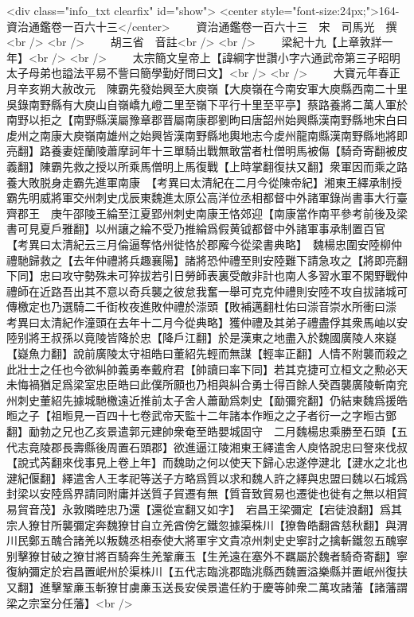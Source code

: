 <div class="info_txt clearfix" id="show">
<center style="font-size:24px;">164-資治通鑑卷一百六十三</center>
  　　資治通鑑卷一百六十三　宋　司馬光　撰<br />
<br />
　　胡三省　音註<br />
<br />
　　梁紀十九【上章敦牂一年】<br />
<br />
　　太宗簡文皇帝上【諱綱字世讚小字六通武帝第三子昭明太子母弟也謚法平易不訾曰簡學勤好問曰文】<br />
<br />
　　大寶元年春正月辛亥朔大赦改元　陳霸先發始興至大庾嶺【大庾嶺在今南安軍大庾縣西南二十里吳錄南野縣有大庾山自嶺嶠九嶝二里至嶺下平行十里至平亭】蔡路養將二萬人軍於南野以拒之【南野縣漢屬豫章郡晋屬南康郡劉昫曰唐韶州始興縣漢南野縣地宋白曰䖍州之南康大庾嶺南雄州之始興皆漢南野縣地輿地志今䖍州龍南縣漢南野縣地將即亮翻】路養妻姪蘭陵蕭摩訶年十三單騎出戰無敢當者杜僧明馬被傷【騎奇寄翻被皮義翻】陳霸先救之授以所乘馬僧明上馬復戰【上時掌翻復扶又翻】衆軍因而乘之路養大敗脱身走霸先進軍南康　【考異曰太清紀在二月今從陳帝紀】湘東王繹承制授霸先明威將軍交州刺史戊辰東魏進太原公高洋位丞相都督中外諸軍錄尚書事大行臺齊郡王　庚午邵陵王綸至江夏郢州刺史南康王恪郊迎【南康當作南平參考前後及梁書可見夏戶雅翻】以州讓之綸不受乃推綸爲假黄钺都督中外諸軍事承制置百官　【考異曰太清紀云三月倫逼奪恪州徙恪於郡廨今從梁書典略】　魏楊忠圍安陸柳仲禮馳歸救之【去年仲禮將兵趣襄陽】諸將恐仲禮至則安陸難下請急攻之【將即亮翻下同】忠曰攻守勢殊未可猝拔若引日勞師表裏受敵非計也南人多習水軍不閑野戰仲禮師在近路吾出其不意以奇兵襲之彼怠我奮一舉可克克仲禮則安陸不攻自拔諸城可傳檄定也乃選騎二千衘枚夜進敗仲禮於漴頭【敗補邁翻杜佑曰漴音崇水所衝曰漴　考異曰太清紀作潼頭在去年十二月今從典略】獲仲禮及其弟子禮盡俘其衆馬岫以安陸别將王叔孫以竟陵皆降於忠【降戶江翻】於是漢東之地盡入於魏國廣陵人來嶷【嶷魚力翻】說前廣陵太守祖皓曰董紹先輕而無謀【輕率正翻】人情不附襲而殺之此壯士之任也今欲糾帥義勇奉戴府君【帥讀曰率下同】若其克捷可立桓文之勲必天未悔禍猶足爲梁室忠臣皓曰此僕所願也乃相與糾合勇士得百餘人癸酉襲廣陵斬南兖州刺史董紹先據城馳檄遠近推前太子舍人蕭勔爲刺史【勔彌兖翻】仍結東魏爲援皓暅之子【祖暅見一百四十七卷武帝天監十二年諸本作暅之之子者衍一之字暅古鄧翻】勔勃之兄也乙亥景遣郭元建帥衆奄至皓嬰城固守　二月魏楊忠乘勝至石頭【五代志竟陵郡長壽縣後周置石頭郡】欲進逼江陵湘東王繹遣舍人庾恪說忠曰詧來伐叔【說式芮翻來伐事見上卷上年】而魏助之何以使天下歸心忠遂停湕北【湕水之北也湕紀偃翻】繹遣舍人王孝祀等送子方略爲質以求和魏人許之繹與忠盟曰魏以石城爲封梁以安陸爲界請同附庸并送質子貿遷有無【質音致貿易也遷徙也徙有之無以相貿易貿音茂】永敦隣睦忠乃還【還從宣翻又如字】　宕昌王梁彌定【宕徒浪翻】爲其宗人獠甘所襲彌定奔魏獠甘自立羌酋傍乞鐵忽據渠株川【獠魯皓翻酋慈秋翻】與渭川民鄭五醜合諸羌以叛魏丞相泰使大將軍宇文貴凉州刺史史寧討之擒斬鐵忽五醜寧别擊獠甘破之獠甘將百騎奔生羌鞏亷玉【生羌遠在塞外不羈屬於魏者騎奇寄翻】寧復納彌定於宕昌置岷州於渠株川【五代志臨洮郡臨洮縣西魏置溢樂縣并置岷州復扶又翻】進擊鞏亷玉斬獠甘虜亷玉送長安侯景遣任約于慶等帥衆二萬攻諸藩【諸藩謂梁之宗室分任藩】<br />
